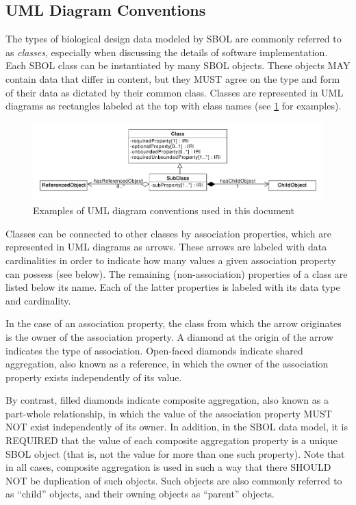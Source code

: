 \subsection{UML Diagram Conventions}
\label{sec:umldiagrams}

The types of biological design data modeled by SBOL are commonly referred to as {\em classes}, especially when discussing the details of software implementation. Each SBOL class can be instantiated by many SBOL objects. These objects MAY contain data that differ in content, but they MUST agree on the type and form of their data as dictated by their common class. Classes are represented in UML diagrams as rectangles labeled at the top with class names (see \ref{fig:uml_sampler} for examples).

\begin{figure}[ht]
\begin{center}
  \includegraphics[width=\textwidth]{uml/uml_sampler.pdf}
\caption{Examples of UML diagram conventions used in this document}
\label{fig:uml_sampler}
\end{center}
\end{figure}

Classes can be connected to other classes by association properties, which are represented in UML diagrams as arrows. These arrows are labeled with data cardinalities in order to indicate how many values a given association property can possess (see below). The remaining (non-association) properties of a class are listed below its name. Each of the latter properties is labeled with its data type and cardinality.

In the case of an association property, the class from which the arrow originates is the owner of the association property. A diamond at the origin of the arrow indicates the type of association.
Open-faced diamonds indicate shared aggregation, also known as a reference, in which the owner of the association property exists independently of its value.

By contrast, filled diamonds indicate composite aggregation, also known as a part-whole relationship, in which the value of the association property MUST NOT exist independently of its owner.
In addition, in the SBOL data model, it is REQUIRED that the value of each composite aggregation property is a unique SBOL object (that is, not the value for more than one such property).
Note that in all cases, composite aggregation is used in such a way that there SHOULD NOT be duplication of such objects.
Such objects are also commonly referred to as ``child'' objects, and their owning objects as ``parent'' objects.

